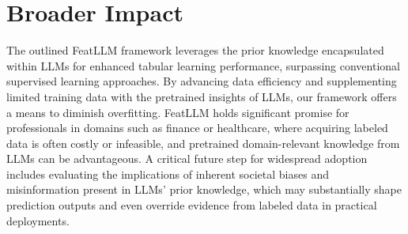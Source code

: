\section{Broader Impact}
The outlined \textsf{FeatLLM} framework leverages the prior knowledge encapsulated within LLMs for enhanced tabular learning performance, surpassing conventional supervised learning approaches. By advancing data efficiency and supplementing limited training data with the pretrained insights of LLMs, our framework offers a means to diminish overfitting. \textsf{FeatLLM} holds significant promise for professionals in domains such as finance or healthcare, where acquiring labeled data is often costly or infeasible, and pretrained domain-relevant knowledge from LLMs can be advantageous. A critical future step for widespread adoption includes evaluating the implications of inherent societal biases and misinformation present in LLMs’ prior knowledge, which may substantially shape prediction outputs and even override evidence from labeled data in practical deployments.

